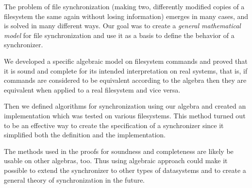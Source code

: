 The problem of file synchronization (making two, differently modified
copies of a filesystem the same again without losing information) emerges
in many cases, and is solved in many different ways. Our goal was to
create a \emph{general mathematical model} for file synchronization and
use it as a basis to define the behavior of a synchronizer.

We developed a specific algebraic model on filesystem commands and proved
that it is sound and complete for its intended interpretation on real
systems, that is, if commands are considered to be equivalent according to
the algebra then they are equivalent when applied to a real filesystem and
vice versa.

Then we defined algorithms for synchronization using our algebra and
created an implementation which was tested on various filesystems. This
method turned out to be an effective way to create the specification of a
synchronizer since it simplified both the definition and the
implementation.

The methods used in the proofs for soundness and completeness are likely
be usable on other algebras, too. Thus using algebraic approach could make
it possible to extend the synchronizer to other types of datasystems and
to create a general theory of synchronization in the future.




